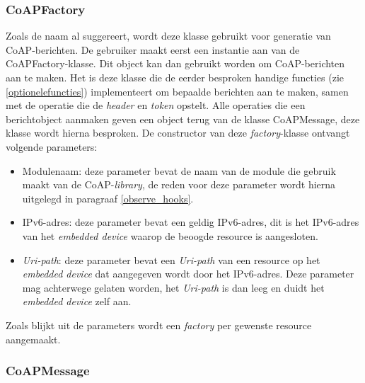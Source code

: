 \subsubsection{CoAPFactory}

Zoals de naam al suggereert, wordt deze klasse gebruikt voor generatie van CoAP-berichten. De gebruiker maakt eerst een instantie aan van de CoAPFactory-klasse. Dit object kan dan gebruikt worden om CoAP-berichten aan te maken. Het is deze klasse die de eerder besproken handige functies (zie \ref{optionelefuncties}) implementeert om bepaalde berichten aan te maken, samen met de operatie die de \textit{header} en \textit{token} opstelt. Alle operaties die een berichtobject aanmaken geven een object terug van de klasse CoAPMessage, deze klasse wordt hierna besproken. De constructor van deze \textit{factory}-klasse ontvangt volgende parameters:
\begin{itemize}
\item Modulenaam: deze parameter bevat de naam van de module die gebruik maakt van de CoAP-\textit{library}, de reden voor deze parameter wordt hierna uitgelegd in paragraaf \ref{observe_hooks}.
\item IPv6-adres: deze parameter bevat een geldig IPv6-adres, dit is het IPv6-adres van het \textit{embedded device} waarop de beoogde resource is aangesloten.
\item \textit{Uri-path}: deze parameter bevat een \textit{Uri-path} van een resource op het \textit{embedded device} dat aangegeven wordt door het IPv6-adres. Deze parameter mag achterwege gelaten worden, het \textit{Uri-path} is dan leeg en duidt het \textit{embedded device} zelf aan.
\end{itemize}
Zoals blijkt uit de parameters wordt een \textit{factory} per gewenste resource aangemaakt.

\subsubsection{CoAPMessage}

